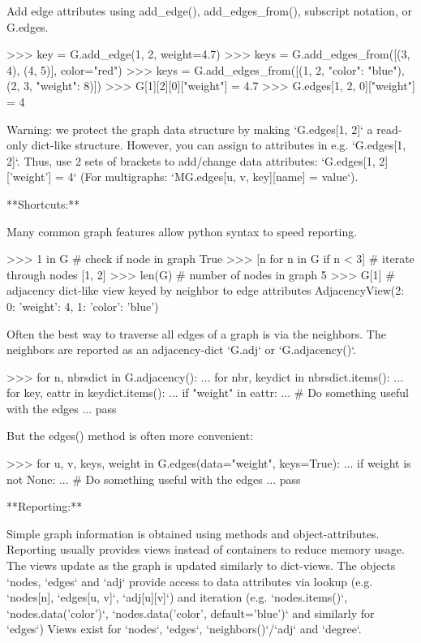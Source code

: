 \begin{DoxyVerb}
Add edge attributes using add_edge(), add_edges_from(), subscript
notation, or G.edges.

>>> key = G.add_edge(1, 2, weight=4.7)
>>> keys = G.add_edges_from([(3, 4), (4, 5)], color="red")
>>> keys = G.add_edges_from([(1, 2, {"color": "blue"}), (2, 3, {"weight": 8})])
>>> G[1][2][0]["weight"] = 4.7
>>> G.edges[1, 2, 0]["weight"] = 4

Warning: we protect the graph data structure by making `G.edges[1, 2]` a
read-only dict-like structure. However, you can assign to attributes
in e.g. `G.edges[1, 2]`. Thus, use 2 sets of brackets to add/change
data attributes: `G.edges[1, 2]['weight'] = 4`
(For multigraphs: `MG.edges[u, v, key][name] = value`).

**Shortcuts:**

Many common graph features allow python syntax to speed reporting.

>>> 1 in G  # check if node in graph
True
>>> [n for n in G if n < 3]  # iterate through nodes
[1, 2]
>>> len(G)  # number of nodes in graph
5
>>> G[1]  # adjacency dict-like view keyed by neighbor to edge attributes
AdjacencyView({2: {0: {'weight': 4}, 1: {'color': 'blue'}}})

Often the best way to traverse all edges of a graph is via the neighbors.
The neighbors are reported as an adjacency-dict `G.adj` or `G.adjacency()`.

>>> for n, nbrsdict in G.adjacency():
...     for nbr, keydict in nbrsdict.items():
...         for key, eattr in keydict.items():
...             if "weight" in eattr:
...                 # Do something useful with the edges
...                 pass

But the edges() method is often more convenient:

>>> for u, v, keys, weight in G.edges(data="weight", keys=True):
...     if weight is not None:
...         # Do something useful with the edges
...         pass

**Reporting:**

Simple graph information is obtained using methods and object-attributes.
Reporting usually provides views instead of containers to reduce memory
usage. The views update as the graph is updated similarly to dict-views.
The objects `nodes, `edges` and `adj` provide access to data attributes
via lookup (e.g. `nodes[n], `edges[u, v]`, `adj[u][v]`) and iteration
(e.g. `nodes.items()`, `nodes.data('color')`,
`nodes.data('color', default='blue')` and similarly for `edges`)
Views exist for `nodes`, `edges`, `neighbors()`/`adj` and `degree`.


\end{DoxyVerb}
